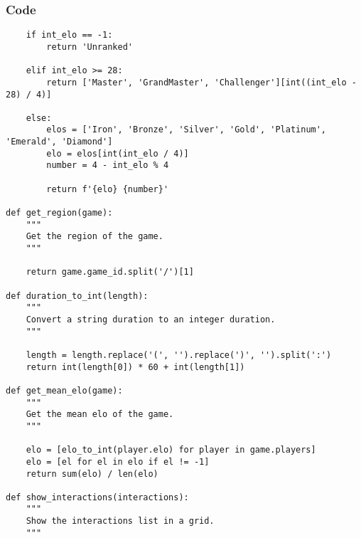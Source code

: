 \documentclass{beamer}
\begin{document}
\begin{frame}[fragile]
    \frametitle{Code}
    \fontsize{3pt}{5pt}\selectfont
    \begin{verbatim}
    if int_elo == -1:
        return 'Unranked'
    
    elif int_elo >= 28:
        return ['Master', 'GrandMaster', 'Challenger'][int((int_elo - 28) / 4)]
    
    else:
        elos = ['Iron', 'Bronze', 'Silver', 'Gold', 'Platinum', 'Emerald', 'Diamond']
        elo = elos[int(int_elo / 4)]
        number = 4 - int_elo % 4

        return f'{elo} {number}'
    
def get_region(game):
    """
    Get the region of the game.
    """
    
    return game.game_id.split('/')[1]

def duration_to_int(length):
    """
    Convert a string duration to an integer duration.
    """
    
    length = length.replace('(', '').replace(')', '').split(':')
    return int(length[0]) * 60 + int(length[1])

def get_mean_elo(game):
    """
    Get the mean elo of the game.
    """
    
    elo = [elo_to_int(player.elo) for player in game.players]
    elo = [el for el in elo if el != -1]
    return sum(elo) / len(elo)

def show_interactions(interactions):
    """
    Show the interactions list in a grid.
    """
    \end{verbatim}
\end{frame}
\end{document}
